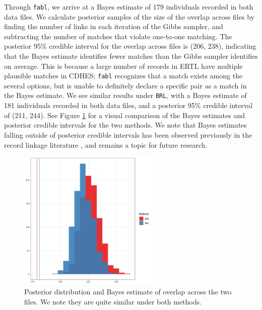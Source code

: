 \documentclass[ba]{imsart}
\begin{document}
	Through \texttt{fabl}, we arrive at a Bayes estimate of 179 individuals recorded in both data files. We calculate posterior samples of the size of the overlap across files by finding the number of links in each iteration of the Gibbs sampler, and subtracting the number of matches that violate one-to-one matching. The posterior 95\% credible interval for the overlap across files is (206, 238), indicating that the Bayes estimate identifies fewer matches than the Gibbs sampler identifies on average. This is because a large number of records in ERTL have multiple plausible matches in CDHES; \texttt{fabl} recognizes that a match exists among the several options, but is unable to definitely declare a specific pair as a match in the Bayes estimate. We see similar results under \texttt{BRL}, with a Bayes estimate of 181 individuals recorded in both data files, and a posterior 95\% credible interval of (211, 244). See Figure \ref{fig:overlap-plot} for a visual comparison of the Bayes estimates and posterior credible intervals for the two methods. We note that Bayes estimates falling outside of posterior credible intervals has been observed previously in the record linkage literature \citep{sadinle_bayesian_2017, steorts_bayesian_2016}, and remains a topic for future research.
	

	
	\begin{figure}[t]
		\begin{center}
			\includegraphics[width=0.6\textwidth]{../notes/figures/el_salvador/overlap_distribution_smallP_bayes}
			\caption{Posterior distribution and Bayes estimate of overlap across the two files. We note they are quite similar under both methods.}
			\label{fig:overlap-plot}
		\end{center}
	\end{figure}
	
\end{document}
